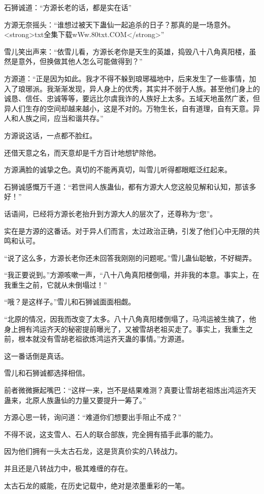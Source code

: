 \begin{this_body}
石狮诚道：“方源长老的话，都是实在话”

方源无奈摇头：“谁想过被天下蛊仙一起追杀的日子？那真的是一场意外。<strong>txt全集下载wWw.80txt.COM</strong>”

雪儿笑出声来：“依雪儿看，方源长老你是天生的英雄，捣毁八十八角真阳楼，虽然是意外，但换做其他人怎么可能做得到？”

方源道：“正是因为如此。我才不得不躲到琅琊福地中，后来发生了一些事情，加入了琅琊派。我渐渐发现，异人身上的优秀，其实并不弱于人族。甚至他们身上的诚恳、信任、忠诚等等，要远比尔虞我诈的人族好上太多。五域天地虽然广袤，但异人们生存的空间却越来越小，这是不对的。万物生长，自有道理，自有天意。异人和人族之间，应当和谐共存。”

方源说这话，一点都不脸红。

还借天意之名，而天意却是千方百计地想铲除他。

方源满脸的诚挚之色。真切的不能再真切，叫雪儿听得都眼眶泛红起来。

石狮诚感慨万千道：“若世间人族蛊仙，都有方源大人您这般见解和认知，那该多好！”

话语间，已经将方源长老抬升到方源大人的层次了，还尊称为“您”。

实在是方源的这番话。对于异人们而言，太过政治正确，引发了他们心中无限的共鸣和认可。

“说了这么多，方源长老你还未回答我刚刚的问题呢。”雪儿蛊仙聪敏，不好糊弄。

“我正要说到。”方源咳嗽一声，“八十八角真阳楼倒塌，并非我的本意。事实上，在我重生之前，它就从未倒塌过！”

“哦？是这样子。”雪儿和石狮诚面面相觑。

“北原的情况，因我而改变了太多。八十八角真阳楼倒塌了，马鸿运被生擒了，他身上拥有鸿运齐天的秘密提前曝光了，又被雪胡老祖买走了。事实上，我重生之前，根本就没有雪胡老祖欲炼鸿运齐天蛊的事情。”方源道。

这一番话倒是真话。

雪儿和石狮诚都选择相信。

前者微微撅起嘴巴：“这样一来，岂不是结果难测？真要让雪胡老祖炼出鸿运齐天蛊来，北原人族蛊仙的力量又要提升一筹了。”

方源心思一转，询问道：“难道你们想要出手阻止不成？”

不得不说，这支雪人、石人的联合部族，完全拥有插手此事的能力。

因为他们拥有一头太古石龙，这是货真价实的八转战力。

并且还是八转战力中，极其难缠的存在。

太古石龙的威能，在历史记载中，绝对是浓墨重彩的一笔。


\end{this_body}

